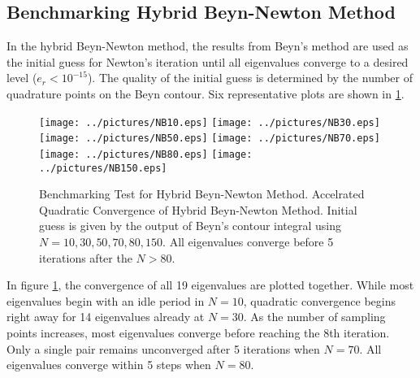 \documentclass[11pt,letterpaper]{article}
\begin{document}
\subsection{Benchmarking Hybrid Beyn-Newton Method}
In the hybrid Beyn-Newton method, the results from Beyn's method are used as the initial guess for Newton's iteration until all eigenvalues converge to a desired level ($e_r<10^{-15}$). The quality of the initial guess is determined by the number of quadrature points on the Beyn contour. Six representative plots are shown in \ref{fig:BeynNewton}. 
\begin{figure}\label{fig:BeynNewton}
\begin{center}
\texttt{[image: ../pictures/NB10.eps]}
\texttt{[image: ../pictures/NB30.eps]}
\texttt{[image: ../pictures/NB50.eps]}
\texttt{[image: ../pictures/NB70.eps]}
\texttt{[image: ../pictures/NB80.eps]}
\texttt{[image: ../pictures/NB150.eps]}
\end{center}
\caption{Benchmarking Test for Hybrid Beyn-Newton Method. \textnormal{Accelrated Quadratic Convergence of Hybrid Beyn-Newton Method. Initial guess is given by the output of Beyn's contour integral using $N=10,30,50,70,80,150$. All eigenvalues converge before 5 iterations after the $N>80$.}}
\end{figure}
In figure \ref{fig:BeynNewton}, the convergence of all 19 eigenvalues are plotted together. While most eigenvalues begin with an idle period in $N=10$, quadratic convergence begins right away for 14 eigenvalues already at $N=30$.
As the number of sampling points increases, most eigenvalues converge before reaching the 8th iteration. Only a single pair remains unconverged after 5 iterations when $N=70$. All eigenvalues converge within 5 steps when $N=80$. 

\end{document}
